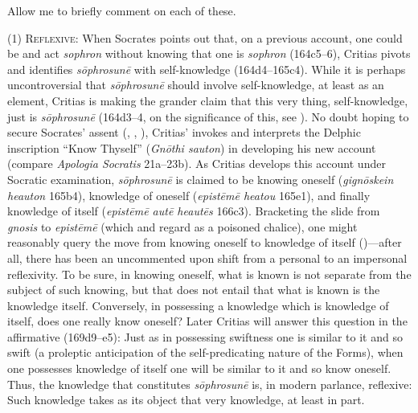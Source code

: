 Allow me to briefly comment on each of these.

(1) \textsc{Reflexive}: When Socrates points out that, on a previous account, one could be and act \emph{sophron} without knowing that one is \emph{sophron} (164c5–6), Critias pivots and identifies \emph{sōphrosunē} with self-knowledge (164d4–165c4). While it is perhaps uncontroversial that \emph{sōphrosunē} should involve self-knowledge, at least as an element, Critias is making the grander claim that this very thing, self-knowledge, just is \emph{sōphrosunē} (164d3–4, on the significance of this, see \citealt{Kosman:2014aa}). No doubt hoping to secure Socrates' assent (\citealt[23–4]{Tuckey:1951aa}, \citealt[81]{Hyland:1981aa}, \citealt[161–2]{Tsouna:2022aa}), Critias' invokes and interprets the Delphic inscription ``Know Thyself'' (\emph{Gnōthi sauton}) in developing his new account (compare \emph{Apologia Socratis} 21a–23b). As Critias develops this account under Socratic examination, \emph{sōphrosunē} is claimed to be knowing oneself (\emph{gignōskein heauton} 165b4), knowledge of oneself (\emph{epistēmē heatou} 165e1), and finally knowledge of itself (\emph{epistēmē autē heautēs} 166c3). Bracketing the slide from \emph{gnosis} to \emph{epistēmē} (which \citealt{Hyland:1981aa} and \citealt{Schmid:1998aa} regard as a poisoned chalice), one might reasonably query the move from knowing oneself to knowledge of itself (\citealt[33–7, 107–8]{Tuckey:1951aa})—after all, there has been an uncommented upon shift from a personal to an impersonal reflexivity. To be sure, in knowing oneself, what is known is not separate from the subject of such knowing, but that does not entail that what is known is the knowledge itself. Conversely, in possessing a knowledge which is knowledge of itself, does one really know oneself? Later Critias will answer this question in the affirmative (169d9–e5): Just as in possessing swiftness one is similar to it and so swift (a proleptic anticipation of the self-predicating nature of the Forms), when one possesses knowledge of itself one will be similar to it and so know oneself. Thus, the knowledge that constitutes \emph{sōphrosunē} is, in modern parlance, reflexive: Such knowledge takes as its object that very knowledge, at least in part.

